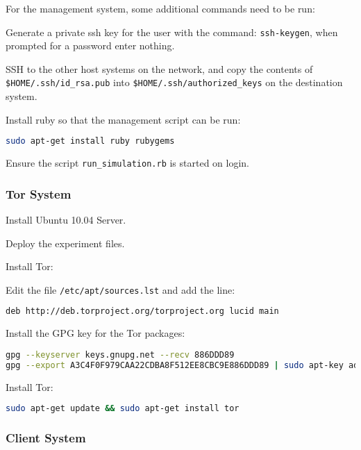 For the management system, some additional commands need to be run:

\begin{enumerate*}
  \item Generate a private ssh key for the user with the command:
    \verb+ssh-keygen+, when prompted for a password enter nothing.
  \item SSH to the other host systems on the network, and copy the contents of
    \verb+$HOME/.ssh/id_rsa.pub+ into \verb+$HOME/.ssh/authorized_keys+ on the
    destination system.
  \item Install ruby so that the management script can be run:
    \begin{lstlisting}[language=sh]
sudo apt-get install ruby rubygems
    \end{lstlisting}
  \item Ensure the script \verb+run_simulation.rb+ is started on login.
\end{enumerate*}

\subsubsection{Tor System}

Install Ubuntu 10.04 Server.

Deploy the experiment files.

Install Tor:

\begin{enumerate*}
  \item Edit the file \verb+/etc/apt/sources.lst+ and add the line:
    \begin{lstlisting}[language=sh]
deb http://deb.torproject.org/torproject.org lucid main
    \end{lstlisting}
  \item Install the GPG key for the Tor packages:
    \begin{lstlisting}[language=sh]
gpg --keyserver keys.gnupg.net --recv 886DDD89
gpg --export A3C4F0F979CAA22CDBA8F512EE8CBC9E886DDD89 | sudo apt-key add -
    \end{lstlisting}
  \item Install Tor:
    \begin{lstlisting}[language=sh]
sudo apt-get update && sudo apt-get install tor
    \end{lstlisting}
\end{enumerate*}

\subsubsection{Client System}

